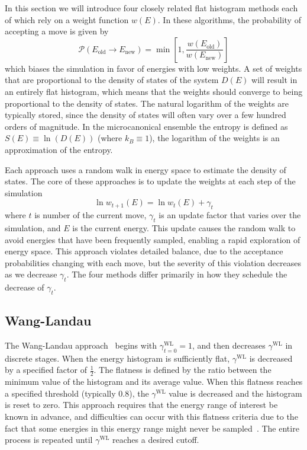 \documentclass[letterpaper,twocolumn,amsmath,amssymb,pre,aps,10pt]{revtex4-1}
\begin{document}
In this section we will introduce four closely related flat histogram
methods each of which rely on a weight function $w(E)$.  In these
algorithms, the probability of accepting a move is given by
\begin{equation}
	\mathcal{P}(E_\text{old} \rightarrow E_\text{new})
	= \min\left[1,\frac{w(E_\text{old})}{w(E_\text{new})}\right]
\end{equation}
which biases the simulation in favor of energies with low weights.  A set of
weights that are proportional to the density of states of the system $D(E)$ will
result in an entirely flat histogram, which means that the weights should
converge to being proportional to the density of states.  The natural logarithm
of the weights are typically stored, since the density of states will often vary
over a few hundred orders of magnitude. In the microcanonical ensemble the
entropy is defined as $S(E) \equiv \ln(D(E))$ (where $k_B \equiv 1$), the
logarithm of the weights is an approximation of the entropy.

Each approach uses a random walk in energy space to estimate the density of
states.  The core of these approaches is to update the weights at each step of
the simulation
\begin{equation}
	\ln{w_{t+1}(E)}=\ln{w_{t}(E)}
	+\gamma_t
\end{equation}
where $t$ is number of the current move, $\gamma_t$ is an update factor
that varies over the simulation, and $E$ is the current energy.  This update
causes the random walk to avoid energies that have been frequently sampled,
enabling a rapid exploration of energy space. This approach violates detailed
balance, due to the acceptance probabilities changing with each move, but the
severity of this violation decreases as we decrease $\gamma_t$.  The four
methods differ primarily in how they schedule the decrease of $\gamma_t$.

\subsection{Wang-Landau}

The Wang-Landau approach~\cite{wang2001efficient,wang2001determining,
landau2014guide} begins with $\gamma^{\text{WL}}_{t=0}=1$, and then decreases
$\gamma^{\text{WL}}$ in discrete stages.  When the energy histogram is
sufficiently flat, $\gamma^{\text{WL}}$ is decreased by a specified factor of
$\frac12$.  The flatness is defined by the ratio between the minimum value of
the histogram and its average value.  When this flatness reaches a specified
threshold (typically 0.8), the $\gamma^{\text{WL}}$ value is decreased and the
histogram is reset to zero.  This approach requires that the energy range of
interest be known in advance, and difficulties can occur with this flatness
criteria due to the fact that some energies in this energy range might never be
sampled~\cite{troster2005wang}.  The entire process is repeated until
$\gamma^{\text{WL}}$ reaches a desired cutoff.
\end{document}
